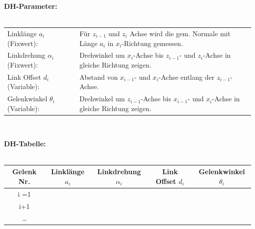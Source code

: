 \begin{minipage}{19cm}
    \textbf{DH-Parameter:}\\ \\
    \begin{tabular}{l l}
        Linklänge $a_i$ (Fixwert): 				& Für $z_{i-1}$ und $z_i$ Achse wird die gem. Normale mit Länge $a_i$ in $x_i$-Richtung gemessen.\\
        Linkdrehung $\alpha_{i}$ (Fixwert):		& Drehwinkel um $x_i$-Achse bis $z_{i-1}$- und $z_i$-Achse in gleiche Richtung zeigen.\\
        Link Offset $d_i$ (Variable):			& Abstand von $x_{i-1}$- und $x_i$-Achse entlang der $z_{i-1}$-Achse.\\
        Gelenkwinkel $\theta_{i}$ (Variable):	& Drehwinkel um $z_{i-1}$-Achse bis $x_{i-1}$- und $x_i$-Achse in gleiche Richtung zeigen.\\
    \end{tabular}
    \vspace{0.5cm}
\end{minipage}\\
\begin{minipage}{19cm}
    \textbf{DH-Tabelle:}\\ \\
    \begin{minipage}{10cm}
        \renewcommand{\arraystretch}{1.1}
        \begin{tabular}{| c | c | c | c | c |}
            \hline
            \textbf{Gelenk Nr.}
            & \textbf{Linklänge $a_i$}
            & \textbf{Linkdrehung $\alpha_{i}$}
            & \textbf{Link Offset $d_i$} 
            & \textbf{Gelenkwinkel $\theta_{i}$}\\
            \hline
            i =1
            &&&& \\
            \hline
            i+1
            &&&& \\
            \hline
            \ldots
            &&&&\\
            \hline
        \end{tabular}
        \renewcommand{\arraystretch}{1}
        \vspace{0.5cm}
    \end{minipage}
\end{minipage}\\
